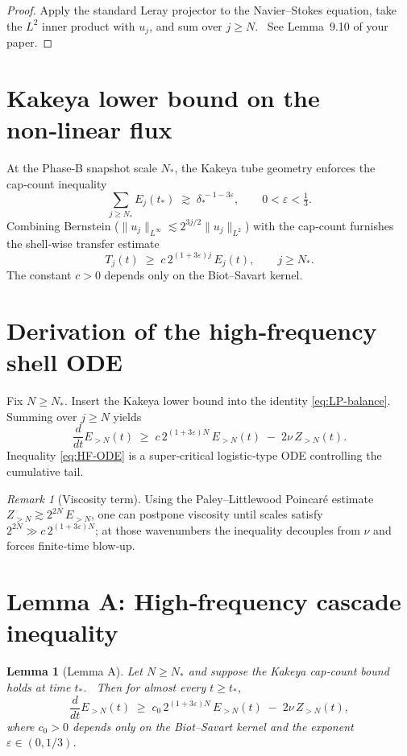 \documentclass[11pt]{article}
\newtheorem{lemma}[theorem]{Lemma}
\theoremstyle{definition}
\theoremstyle{remark}
\newtheorem{remark}[theorem]{Remark}
\newcommand{\E}{E}
\newcommand{\Z}{Z}
\newcommand{\nuvisc}{\nu}
\newcommand{\boxedEq}[1]{\begin{equation}\boxed{#1}\end{equation}}
\begin{document}
\begin{proof}
Apply the standard Leray projector to the Navier--Stokes equation, take the $L^2$ inner product with $u_j$, and sum over $j\ge N$.  See Lemma~9.10 of your paper.
\end{proof}


\section{Kakeya lower bound on the non‑linear flux}

At the Phase‑B snapshot scale $N_*$, the Kakeya tube geometry enforces the cap‑count inequality
\[
\sum_{j\ge N_*}\E_j(t_*)\;\gtrsim\;\delta_{*}^{\,-1-3\varepsilon},\qquad 0<\varepsilon<\tfrac13.
\]
Combining Bernstein ($\|u_j\|_{L^\infty}\lesssim 2^{3j/2}\|u_j\|_{L^2}$) with the cap‑count furnishes the shell‑wise transfer estimate
\[
T_j(t)\;\ge\;c\,2^{(1+3\varepsilon)j}\,\E_j(t),\qquad j\ge N_{*}.
\]
The constant $c>0$ depends only on the Biot--Savart kernel.

\section{Derivation of the high‑frequency shell ODE}

Fix $N\ge N_{*}$. Insert the Kakeya lower bound into the identity \eqref{eq:LP-balance}. Summing over $j\ge N$ yields
\boxedEq{\frac{d}{dt}\E_{>N}(t)\;\ge\;c\,2^{(1+3\varepsilon)N}\,\E_{>N}(t)\;-\;2\nuvisc\,\Z_{>N}(t).}\label{eq:HF-ODE}
Inequality \eqref{eq:HF-ODE} is a super‑critical logistic‑type ODE controlling the cumulative tail.

\begin{remark}[Viscosity term]
Using the Paley--Littlewood Poincar\'e estimate $\Z_{>N}\gtrsim 2^{2N}\,\E_{>N}$, one can postpone viscosity until scales satisfy $2^{2N}\gg c\,2^{(1+3\varepsilon)N}$; at those wavenumbers the inequality decouples from $\nuvisc$ and forces finite‑time blow‑up.
\end{remark}

\section{Lemma A: High‑frequency cascade inequality}

\begin{lemma}[Lemma A]\label{lem:HF-cascade}
Let $N\ge N_*$ and suppose the Kakeya cap‑count bound holds at time $t_*$.  Then for almost every $t\ge t_*$,
\boxedEq{\frac{d}{dt}\E_{>N}(t)\;\ge\;c_0\,2^{(1+3\varepsilon)N}\,\E_{>N}(t)\;-\;2\nuvisc\,\Z_{>N}(t),\label{eq:lemmaA}}
where $c_0>0$ depends only on the Biot--Savart kernel and the exponent $\varepsilon\in(0,1/3)$.
\end{lemma}
\end{document}
